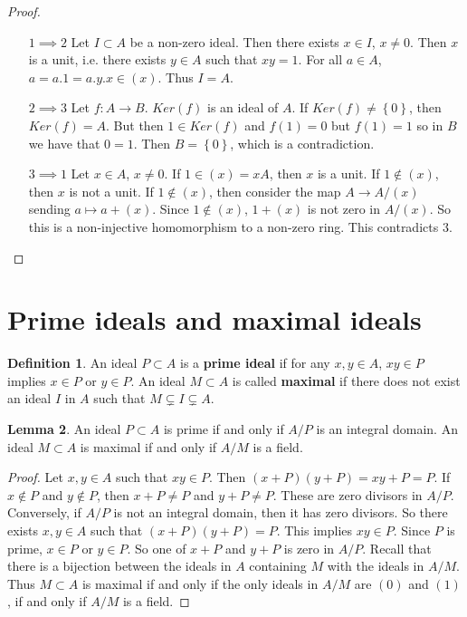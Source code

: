 \documentclass{article}
\newcommand{\rb}[1]{\left( #1 \right)}
\newcommand{\cb}[1]{\left\{ #1 \right\}}
\theoremstyle{definition}\newtheorem{definition}{Definition}[section]
\theoremstyle{definition}\newtheorem{remark}[definition]{Remark}
\theoremstyle{definition}\newtheorem*{example}{Example}
\theoremstyle{definition}\newtheorem*{note}{Note}
\newtheorem{lemma}[definition]{Lemma}
\begin{document}
\begin{proof}
\hfill
\begin{enumerate}[leftmargin=2cm]
\item[$ 1 \implies 2 $] Let $ I \subset A $ be a non-zero ideal. Then there exists $ x \in I $, $ x \ne 0 $. Then $ x $ is a unit, i.e. there exists $ y \in A $ such that $ xy = 1 $. For all $ a \in A $, $ a = a.1 = a.y.x \in \rb{x} $. Thus $ I = A $.
\item[$ 2 \implies 3 $] Let $ f : A \to B $. $ Ker\rb{f} $ is an ideal of $ A $. If $ Ker\rb{f} \ne \cb{0} $, then $ Ker\rb{f} = A $. But then $ 1 \in Ker\rb{f} $ and $ f\rb{1} = 0 $ but $ f\rb{1} = 1 $ so in $ B $ we have that $ 0 = 1 $. Then $ B = \cb{0} $, which is a contradiction.
\item[$ 3 \implies 1 $] Let $ x \in A $, $ x \ne 0 $. If $ 1 \in \rb{x} = xA $, then $ x $ is a unit. If $ 1 \notin \rb{x} $, then $ x $ is not a unit. If $ 1 \notin \rb{x} $, then consider the map $ A \to A / \rb{x} $ sending $ a \mapsto a + \rb{x} $. Since $ 1 \notin \rb{x} $, $ 1 + \rb{x} $ is not zero in $ A / \rb{x} $. So this is a non-injective homomorphism to a non-zero ring. This contradicts $ 3 $.
\end{enumerate}
\end{proof}

\section{Prime ideals and maximal ideals}

\begin{definition}
An ideal $ P \subset A $ is a \textbf{prime ideal} if for any $ x, y \in A $, $ xy \in P $ implies $ x \in P $ or $ y \in P $. An ideal $ M \subset A $ is called \textbf{maximal} if there does not exist an ideal $ I $ in $ A $ such that $ M \subsetneq I \subsetneq A $.
\end{definition}

\begin{lemma}
An ideal $ P \subset A $ is prime if and only if $ A / P $ is an integral domain. An ideal $ M \subset A $ is maximal if and only if $ A / M $ is a field.
\end{lemma}

\begin{proof}
Let $ x, y \in A $ such that $ xy \in P $. Then $ \rb{x + P}\rb{y + P} = xy + P = P $. If $ x \notin P $ and $ y \notin P $, then $ x + P \ne P $ and $ y + P \ne P $. These are zero divisors in $ A / P $. Conversely, if $ A / P $ is not an integral domain, then it has zero divisors. So there exists $ x, y \in A $ such that $ \rb{x + P}\rb{y + P} = P $. This implies $ xy \in P $. Since $ P $ is prime, $ x \in P $ or $ y \in P $. So one of $ x + P $ and $ y + P $ is zero in $ A / P $. Recall that there is a bijection between the ideals in $ A $ containing $ M $ with the ideals in $ A / M $. Thus $ M \subset A $ is maximal if and only if the only ideals in $ A / M $ are $ \rb{0} $ and $ \rb{1} $, if and only if $ A / M $ is a field.
\end{proof}
\end{document}
